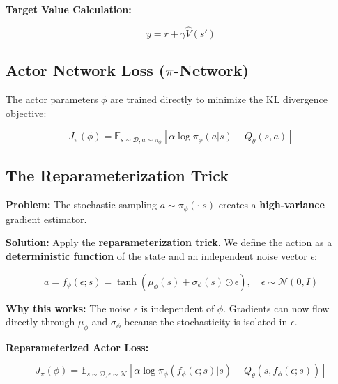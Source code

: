 \documentclass[12pt,a4paper]{article}
\theoremstyle{noteplain}
\theoremstyle{noteexercise}
\begin{document}
\textbf{Target Value Calculation:}

$$y = r + \gamma \hat{V}(s')$$



\subsection{Actor Network Loss ($\pi$-Network)}\label{ssec:actor-loss}



The actor parameters $\phi$ are trained directly to minimize the KL divergence objective:

\begin{equation}\label{eq:actor-loss}
\boxed{J_\pi(\phi) = \mathbb{E}_{s \sim \mathcal{D}, a \sim \pi_\phi}\left[\alpha \log\pi_\phi(a|s) - Q_\theta(s,a)\right]}
\end{equation}



\subsection{The Reparameterization Trick}\label{ssec:reparam}



\textbf{Problem:} The stochastic sampling $a \sim \pi_\phi(\cdot|s)$ creates a \textbf{high-variance} gradient estimator.

\textbf{Solution:} Apply the \textbf{reparameterization trick}. We define the action as a \textbf{deterministic function} of the state and an independent noise vector $\epsilon$:

\begin{equation}\label{eq:reparam}
\boxed{a = f_\phi(\epsilon; s) = \tanh\left(\mu_\phi(s) + \sigma_\phi(s) \odot \epsilon\right), \quad \epsilon \sim \mathcal{N}(0, I)}
\end{equation}

\textbf{Why this works:} The noise $\epsilon$ is independent of $\phi$. Gradients can now flow directly through $\mu_\phi$ and $\sigma_\phi$ because the stochasticity is isolated in $\epsilon$.

\textbf{Reparameterized Actor Loss:}

$$J_\pi(\phi) = \mathbb{E}_{s \sim \mathcal{D}, \epsilon \sim \mathcal{N}}\left[\alpha \log\pi_\phi(f_\phi(\epsilon;s)|s) - Q_\theta(s, f_\phi(\epsilon;s))\right]$$



\end{document}

